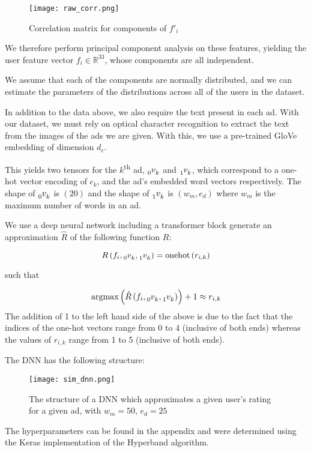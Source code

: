 \begin{figure}[H]
    \centering
    \texttt{[image: raw\_corr.png]}
    \caption{Correlation matrix for components of $f'_i$}
\end{figure}

We therefore perform principal component analysis on these features, yielding the user feature vector $f_i\in \mathbb{R}^{33}$, whose components are all independent.

We assume that each of the components are normally distributed, and we can estimate the parameters of the distributions across all of the users in the dataset.

In addition to the data above, we also require the text present in each ad. With our dataset, we must rely on optical character recognition to extract the text from the images of the ads we are given. With this, we use a pre-trained GloVe\cite{glove} embedding of dimension $d_e$.

This yields two tensors for the $k$\textsuperscript{th} ad, $\tensor*[_0]{v}{_k}$ and $\tensor*[_1]{v}{_k}$, which correspond to a one-hot vector encoding of $c_k$, and the ad's embedded word vectors respectively. The shape of $\tensor*[_0]{v}{_k}$ is $(20)$ and the shape of $\tensor*[_1]{v}{_k}$ is $(w_m, e_d)$ where $w_m$ is the maximum number of words in an ad.

We use a deep neural network including a transformer block\cite{transformer} generate an approximation $\hat{R}$ of the following function $R$:

\begin{equation*}
    R\left(f_i, \tensor*[_0]{v}{_k}, \tensor*[_1]{v}{_k}\right) = \textrm{onehot}\left(r_{i,k}\right)
\end{equation*}

such that

\begin{equation*}
    \textrm{argmax}\left(\hat{R}\left(f_i, \tensor*[_0]{v}{_k}, \tensor*[_1]{v}{_k}\right)\right) + 1 \approx r_{i,k}
\end{equation*}
The addition of 1 to the left hand side of the above is due to the fact that the indices of the one-hot vectors range from 0 to 4 (inclusive of both ends) whereas the values of $r_{i,k}$ range from 1 to 5 (inclusive of both ends).

The DNN has the following structure:

\begin{figure}[H]
    \centering
    \texttt{[image: sim\_dnn.png]}
    \caption{The structure of a DNN which approximates a given user's rating for a given ad, with $w_m=50$, $e_d=25$}
\end{figure}

The hyperparameters can be found in the appendix and were determined using the Keras\cite{keras} implementation of the Hyperband algorithm\cite{hyperband}.